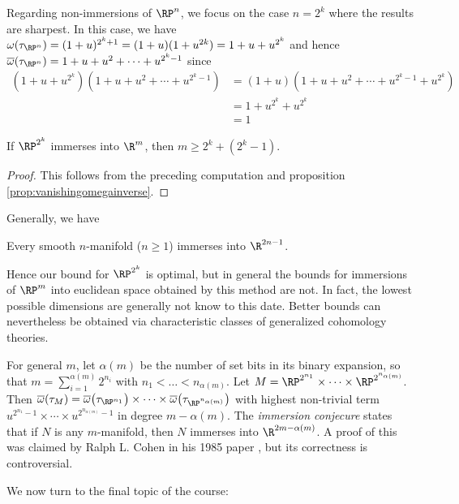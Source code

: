 Regarding non-immersions of $\RP^n$, we focus on the case $n = 2^k$ where the results are sharpest.
In this case, we have $\omega(\tau_{\RP^n}) = (1 + u)^{2^k + 1} = (1 + u)(1 + u^{2k}) = 1 + u + u^{2^k}$ and hence $\overline{\omega}(\tau_{\RP^n}) = 1 + u + u^2 + \cdots + u^{2^k - 1}$ since
\begin{align*}
	(1 + u + u^{2^k})(1 + u + u^2 + \cdots + u^{2^k - 1}) &= (1 + u)(1 + u + u^2 + \cdots + u^{2^k - 1} + u^{2^k}) \\
														  &= 1 + u^{2^k} + u^{2^k} \\
														  &= 1
\end{align*}
\begin{corollary}
	If $\RP^{2^k}$ immerses into $\R^m$, then $m \geq 2^k + (2^k - 1)$.
\end{corollary}
\begin{proof}
	This follows from the preceding computation and proposition \ref{prop:vanishingomegainverse}.
\end{proof}
Generally, we have
\begin{theorem}[Whitney]
	Every smooth $n$-manifold ($n \geq 1$) immerses into $\R^{2n - 1}$.
\end{theorem}
Hence our bound for $\RP^{2^k}$ is optimal, but in general the bounds for immersions of $\RP^m$ into euclidean space obtained by this method are not.
In fact, the lowest possible dimensions are generally not know to this date.
Better bounds can nevertheless be obtained via characteristic classes of generalized cohomology theories.

For general $m$, let $\alpha(m)$ be the number of set bits in its binary expansion, so that $m = \sum_{i = 1}^{\alpha(m)} 2^{n_i}$ with $n_1 < \ldots < n_{\alpha(m)}$.
Let $M = \RP^{2^{n_1}} \times \cdots \times \RP^{2^{n_{\alpha(m)}}}$.
Then $\overline{\omega}(\tau_M) = \overline{\omega}\big(\tau_{\RP^{n_1}}\big) \times \cdots \times \overline{\omega}\big(\tau_{\RP^{n_{\alpha(m)}}}\big)$ with highest non-trivial term $u^{2^{n_1} - 1} \times \cdots \times u^{2^{n_{\alpha(m)}} - 1}$ in degree $m - \alpha(m)$.
The \emph{immersion conjecure} states that if $N$ is any $m$-manifold, then $N$ immerses into $\R^{2m - \alpha(m)}$.
A proof of this was claimed by Ralph L. Cohen in his 1985 paper \cite{cohen_immersion_1985}, but its correctness is controversial.

We now turn to the final topic of the course:
